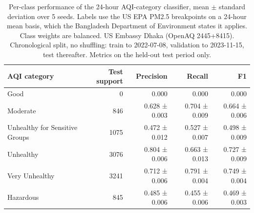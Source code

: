 \begin{table}[htbp]
\caption{Per-class performance of the 24-hour AQI-category classifier, mean $\pm$ standard deviation over 5 seeds. Labels use the US EPA PM2.5 breakpoints on a 24-hour mean basis, which the Bangladesh Department of Environment states it applies. Class weights are balanced. US Embassy Dhaka (OpenAQ 2445+8415). Chronological split, no shuffling: train to 2022-07-08, validation to 2023-11-15, test thereafter. Metrics on the held-out test period only.}
\label{tab:classification_per_class}
\begin{tabular}{lrrrr}
\toprule
AQI category & Test support & Precision & Recall & F1 \\
\midrule
Good & 0 & 0.000 & 0.000 & 0.000 \\
Moderate & 846 & 0.628 ± 0.003 & 0.704 ± 0.009 & 0.664 ± 0.006 \\
Unhealthy for Sensitive Groups & 1075 & 0.472 ± 0.012 & 0.527 ± 0.007 & 0.498 ± 0.009 \\
Unhealthy & 3076 & 0.804 ± 0.006 & 0.663 ± 0.013 & 0.727 ± 0.009 \\
Very Unhealthy & 3241 & 0.712 ± 0.006 & 0.791 ± 0.004 & 0.749 ± 0.004 \\
Hazardous & 845 & 0.485 ± 0.006 & 0.455 ± 0.006 & 0.469 ± 0.003 \\
\bottomrule
\end{tabular}
\end{table}
